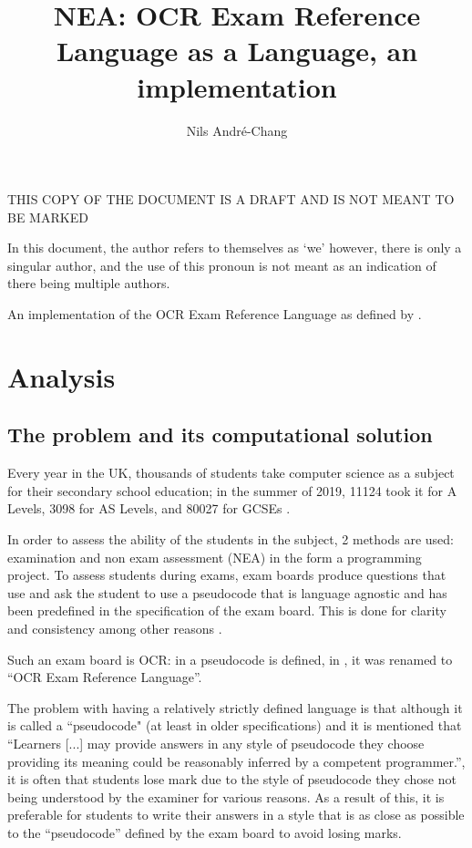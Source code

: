 \documentclass{article}
\author{Nils André-Chang}
\title{NEA: OCR Exam Reference Language as a Language, an implementation}
\begin{document}
{\huge THIS COPY OF THE DOCUMENT IS A DRAFT AND IS NOT MEANT TO BE MARKED}

\maketitle

\tableofcontents

In this document, the author refers to themselves as `we' however, there is
only a singular author, and the use of this pronoun is not meant as an
indication of there being multiple authors.

An implementation of the OCR Exam Reference Language as defined by
\textcite{j277, h446}.

\section{Analysis}

\subsection{The problem and its computational solution}

Every year in the UK, thousands of students take computer science as a subject
for their secondary school education; in the summer of 2019, 11124 took it for
A Levels, 3098 for AS Levels, and 80027 for GCSEs
\cite{jcqalevel19, jcqgcse19}.

In order to assess the ability of the students in the subject, 2 methods are
used: examination and non exam assessment (NEA) in the form a programming
project. To assess students during exams, exam boards produce questions that
use and ask the student to use a pseudocode that is language agnostic and has
been predefined in the specification of the exam board.  This is done for
clarity and consistency among other reasons \cite{h446, j276, j277}.

Such an exam board is OCR: in \textcite{h446, j276, j277} a pseudocode is
defined, in \textcite{j277}, it was renamed to ``OCR Exam Reference Language''.

The problem with having a relatively strictly defined language is that although
it is called a ``pseudocode" (at least in older specifications) and it is
mentioned that ``Learners [...] may provide answers in any style of pseudocode
they choose providing its meaning could be reasonably inferred by a competent
programmer.'', it is often that students lose mark due to the style of
pseudocode they chose not being understood by the examiner for various reasons.
As a result of this, it is preferable for students to write their answers in a
style that is as close as possible to the ``pseudocode'' defined by the exam
board to avoid losing marks.
\end{document}
